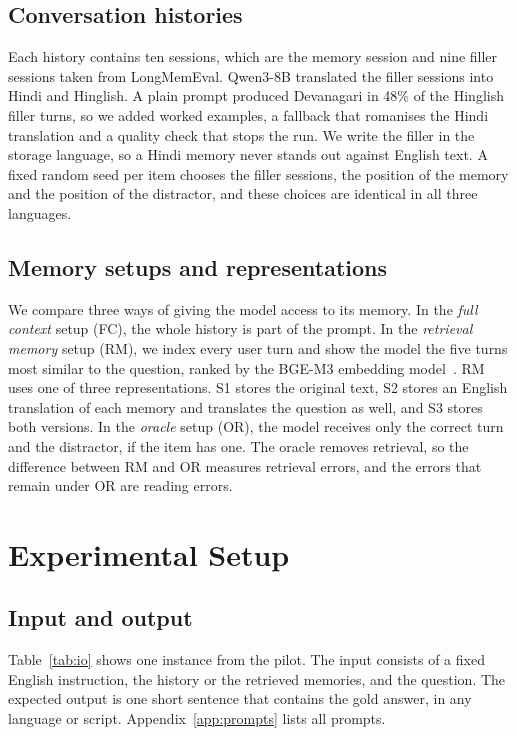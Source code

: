 \documentclass[11pt]{article}
\begin{document}
\subsection{Conversation histories}
Each history contains ten sessions, which are the memory session and nine filler sessions taken from LongMemEval.
Qwen3-8B translated the filler sessions into Hindi and Hinglish.
A plain prompt produced Devanagari in 48\% of the Hinglish filler turns, so we added worked examples, a fallback that romanises the Hindi translation and a quality check that stops the run.
We write the filler in the storage language, so a Hindi memory never stands out against English text.
A fixed random seed per item chooses the filler sessions, the position of the memory and the position of the distractor, and these choices are identical in all three languages.

\subsection{Memory setups and representations}
We compare three ways of giving the model access to its memory.
In the \emph{full context} setup (FC), the whole history is part of the prompt.
In the \emph{retrieval memory} setup (RM), we index every user turn and show the model the five turns most similar to the question, ranked by the BGE-M3 embedding model~\citep{chen2024bgem3}.
RM uses one of three representations.
S1 stores the original text, S2 stores an English translation of each memory and translates the question as well, and S3 stores both versions.
In the \emph{oracle} setup (OR), the model receives only the correct turn and the distractor, if the item has one.
The oracle removes retrieval, so the difference between RM and OR measures retrieval errors, and the errors that remain under OR are reading errors.

\section{Experimental Setup}
\label{sec:setup}

\subsection{Input and output}
Table~\ref{tab:io} shows one instance from the pilot.
The input consists of a fixed English instruction, the history or the retrieved memories, and the question.
The expected output is one short sentence that contains the gold answer, in any language or script.
Appendix~\ref{app:prompts} lists all prompts.
\end{document}
